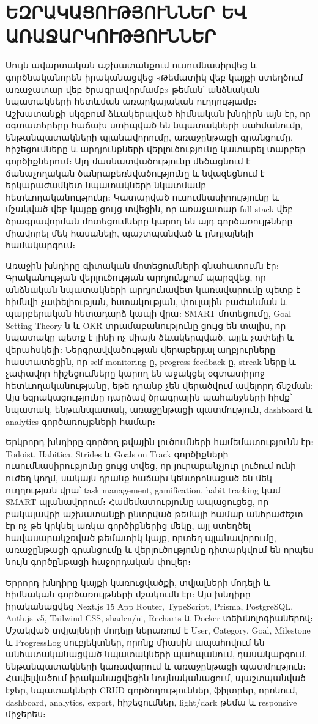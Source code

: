 \chapter{ԵԶՐԱԿԱՑՈՒԹՅՈՒՆՆԵՐ ԵՎ ԱՌԱՋԱՐԿՈՒԹՅՈՒՆՆԵՐ}
\sloppy

Սույն ավարտական աշխատանքում ուսումնասիրվեց և գործնականորեն իրականացվեց «Թեմատիկ վեբ կայքի ստեղծում առաջատար վեբ ծրագրավորմամբ» թեման՝ անձնական նպատակների հետևման առարկայական ուղղությամբ։ Աշխատանքի սկզբում ձևակերպված հիմնական խնդիրն այն էր, որ օգտատերերը հաճախ ստիպված են նպատակների սահմանումը, ենթանպատակների պլանավորումը, առաջընթացի գրանցումը, հիշեցումները և արդյունքների վերլուծությունը կատարել տարբեր գործիքներում։ Այդ մասնատվածությունը մեծացնում է ճանաչողական ծանրաբեռնվածությունը և նվազեցնում է երկարաժամկետ նպատակների նկատմամբ հետևողականությունը։ Կատարված ուսումնասիրությունը և մշակված վեբ կայքը ցույց տվեցին, որ առաջատար full-stack վեբ ծրագրավորման մոտեցումները կարող են այդ գործառույթները միավորել մեկ հասանելի, պաշտպանված և ընդլայնելի համակարգում։

Առաջին խնդիրը գիտական մոտեցումների գնահատումն էր։ Գրականության վերլուծության արդյունքում պարզվեց, որ անձնական նպատակների արդյունավետ կառավարումը պետք է հիմնվի չափելիության, հստակության, փուլային բաժանման և պարբերական հետադարձ կապի վրա։ SMART մոտեցումը, Goal Setting Theory-ն և OKR տրամաբանությունը ցույց են տալիս, որ նպատակը պետք է լինի ոչ միայն ձևակերպված, այլև չափելի և վերահսկելի։ Ներգրավվածության վերաբերյալ աղբյուրները հաստատեցին, որ self-monitoring-ը, progress feedback-ը, streak-ները և չափավոր հիշեցումները կարող են աջակցել օգտատիրոջ հետևողականությանը, եթե դրանք չեն վերածվում ավելորդ ճնշման։ Այս եզրակացությունը դարձավ ծրագրային պահանջների հիմք՝ նպատակ, ենթանպատակ, առաջընթացի պատմություն, dashboard և analytics գործառույթների համար։

Երկրորդ խնդիրը գործող թվային լուծումների համեմատությունն էր։ Todoist, Habitica, Strides և Goals on Track գործիքների ուսումնասիրությունը ցույց տվեց, որ յուրաքանչյուր լուծում ունի ուժեղ կողմ, սակայն դրանք հաճախ կենտրոնացած են մեկ ուղղության վրա՝ task management, gamification, habit tracking կամ SMART պլանավորում։ Համեմատությունը ապացուցեց, որ բակալավրի աշխատանքի ընտրված թեմայի համար անհրաժեշտ էր ոչ թե կրկնել առկա գործիքներից մեկը, այլ ստեղծել հավասարակշռված թեմատիկ կայք, որտեղ պլանավորումը, առաջընթացի գրանցումը և վերլուծությունը դիտարկվում են որպես նույն գործընթացի հաջորդական փուլեր։

Երրորդ խնդիրը կայքի կառուցվածքի, տվյալների մոդելի և հիմնական գործառույթների մշակումն էր։ Այս խնդիրը իրականացվեց Next.js 15 App Router, TypeScript, Prisma, PostgreSQL, Auth.js v5, Tailwind CSS, shadcn/ui, Recharts և Docker տեխնոլոգիաներով։ Մշակված տվյալների մոդելը ներառում է User, Category, Goal, Milestone և ProgressLog սուբյեկտներ, որոնք միասին ապահովում են անհատականացված նպատակների պահպանում, դասակարգում, ենթանպատակների կառավարում և առաջընթացի պատմություն։ Հավելվածում իրականացվեցին նույնականացում, պաշտպանված էջեր, նպատակների CRUD գործողություններ, ֆիլտրեր, որոնում, dashboard, analytics, export, հիշեցումներ, light/dark թեմա և responsive միջերես։

